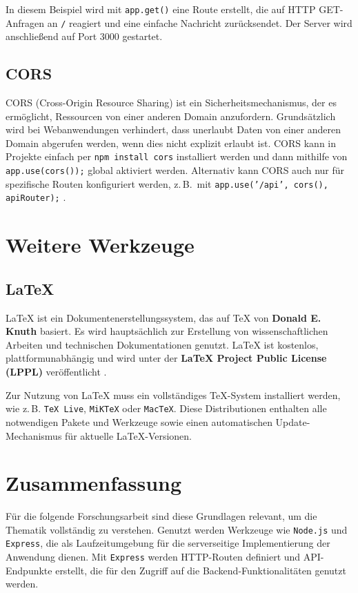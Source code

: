 \documentclass[oneside]{ausarbeitung}
\begin{document}
In diesem Beispiel wird mit \texttt{app.get()} eine Route erstellt, die auf HTTP GET-Anfragen an \texttt{/} reagiert und eine einfache Nachricht zurücksendet. Der Server wird anschließend auf Port 3000 gestartet.  

\subsection{CORS}

CORS (Cross-Origin Resource Sharing) ist ein Sicherheitsmechanismus, der es ermöglicht, Ressourcen von einer anderen Domain anzufordern. Grundsätzlich wird bei Webanwendungen verhindert, dass unerlaubt Daten von einer anderen Domain abgerufen werden, wenn dies nicht explizit erlaubt ist. CORS kann in Projekte einfach per \texttt{npm install cors} installiert werden und dann mithilfe von \texttt{app.use(cors());} global aktiviert werden. Alternativ kann CORS auch nur für spezifische Routen konfiguriert werden, z.\,B.\ mit \texttt{app.use('/api', cors(), apiRouter);} \parencite{cors-npm}.

\section{Weitere Werkzeuge}

\subsection{LaTeX}

\LaTeX{} ist ein Dokumentenerstellungssystem, das auf \TeX{} von \textbf{Donald E. Knuth} basiert. Es wird hauptsächlich zur Erstellung von wissenschaftlichen Arbeiten und technischen Dokumentationen genutzt. \LaTeX{} ist kostenlos, plattformunabhängig und wird unter der \textbf{LaTeX Project Public License (LPPL)} veröffentlicht \parencite{latex-project}.  

Zur Nutzung von \LaTeX{} muss ein vollständiges \TeX-System installiert werden, wie z.\,B. \texttt{TeX Live}, \texttt{MiKTeX} oder \texttt{MacTeX}. Diese Distributionen enthalten alle notwendigen Pakete und Werkzeuge sowie einen automatischen Update-Mechanismus für aktuelle \LaTeX-Versionen.  

\section{Zusammenfassung}

Für die folgende Forschungsarbeit sind diese Grundlagen relevant, um die Thematik vollständig zu verstehen. Genutzt werden Werkzeuge wie \texttt{Node.js} und \texttt{Express}, die als Laufzeitumgebung für die serverseitige Implementierung der Anwendung dienen. Mit \texttt{Express} werden HTTP-Routen definiert und API-Endpunkte erstellt, die für den Zugriff auf die Backend-Funktionalitäten genutzt werden.  
\end{document}
